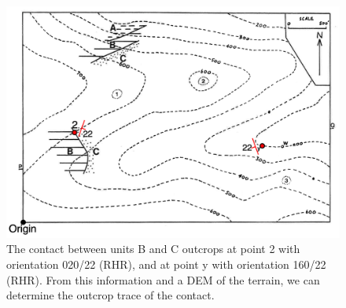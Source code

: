 \documentclass[a4paper , 12pt]{book}
\begin{document}
 \begin{figure}[ht]
    \centering
    \includegraphics[width=11.8cm]{Figures/ch5f5.png}
    \caption{The contact between units B and C outcrops at point 2 with orientation 020/22 (RHR), and at point y with orientation 160/22 (RHR). From this information and a DEM of the terrain, we can determine the outcrop trace of the contact.}
\end{figure}
\end{document}
